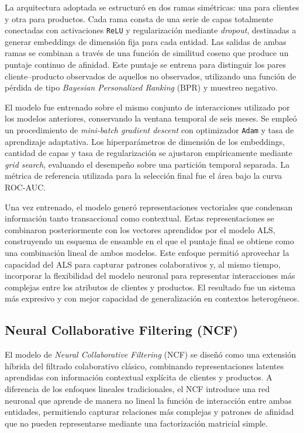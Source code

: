 La arquitectura adoptada se estructuró en dos ramas simétricas: una para clientes y otra para productos. Cada rama consta de una serie de capas totalmente conectadas con activaciones \texttt{ReLU} y regularización mediante \textit{dropout}, destinadas a generar embeddings de dimensión fija para cada entidad. Las salidas de ambas ramas se combinan a través de una función de similitud coseno que produce un puntaje continuo de afinidad. Este puntaje se entrena para distinguir los pares cliente–producto observados de aquellos no observados, utilizando una función de pérdida de tipo \textit{Bayesian Personalized Ranking} (BPR) y muestreo negativo.

El modelo fue entrenado sobre el mismo conjunto de interacciones utilizado por los modelos anteriores, conservando la ventana temporal de seis meses. Se empleó un procedimiento de \textit{mini-batch gradient descent} con optimizador \texttt{Adam} y tasa de aprendizaje adaptativa. Los hiperparámetros de dimensión de los embeddings, cantidad de capas y tasa de regularización se ajustaron empíricamente mediante \textit{grid search}, evaluando el desempeño sobre una partición temporal separada. La métrica de referencia utilizada para la selección final fue el área bajo la curva ROC-AUC.

Una vez entrenado, el modelo generó representaciones vectoriales que condensan información tanto transaccional como contextual. Estas representaciones se combinaron posteriormente con los vectores aprendidos por el modelo ALS, construyendo un esquema de ensamble en el que el puntaje final se obtiene como una combinación lineal de ambos modelos. Este enfoque permitió aprovechar la capacidad del ALS para capturar patrones colaborativos y, al mismo tiempo, incorporar la flexibilidad del modelo neuronal para representar interacciones más complejas entre los atributos de clientes y productos. El resultado fue un sistema más expresivo y con mejor capacidad de generalización en contextos heterogéneos.

\subsection{Neural Collaborative Filtering (NCF)}

El modelo de \textit{Neural Collaborative Filtering} (NCF) \cite{ARTICLE:He2017} se diseñó como una extensión híbrida del filtrado colaborativo clásico, combinando representaciones latentes aprendidas con información contextual explícita de clientes y productos. A diferencia de los enfoques lineales tradicionales, el NCF introduce una red neuronal que aprende de manera no lineal la función de interacción entre ambas entidades, permitiendo capturar relaciones más complejas y patrones de afinidad que no pueden representarse mediante una factorización matricial simple.

